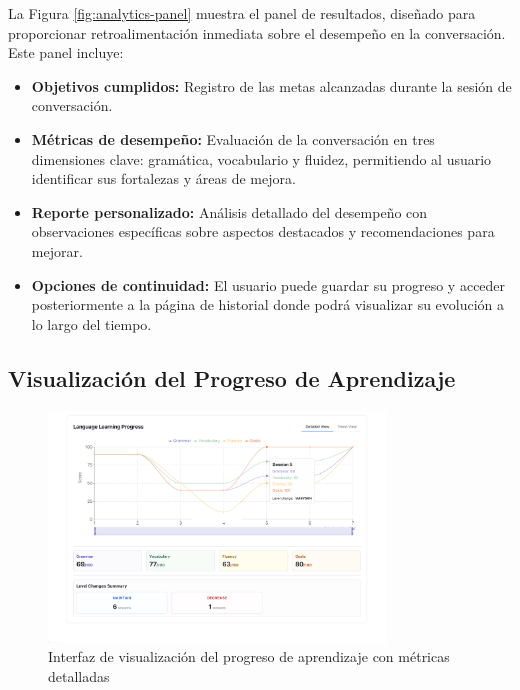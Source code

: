 La Figura \ref{fig:analytics-panel} muestra el panel de resultados, diseñado para proporcionar retroalimentación inmediata sobre el desempeño en la conversación. Este panel incluye:

\begin{itemize}
    \item \textbf{Objetivos cumplidos:} Registro de las metas alcanzadas durante la sesión de conversación.
    
    \item \textbf{Métricas de desempeño:} Evaluación de la conversación en tres dimensiones clave: gramática, vocabulario y fluidez, permitiendo al usuario identificar sus fortalezas y áreas de mejora.
    
    \item \textbf{Reporte personalizado:} Análisis detallado del desempeño con observaciones específicas sobre aspectos destacados y recomendaciones para mejorar.
    
    \item \textbf{Opciones de continuidad:} El usuario puede guardar su progreso y acceder posteriormente a la página de historial donde podrá visualizar su evolución a lo largo del tiempo.
\end{itemize}

\subsection{Visualización del Progreso de Aprendizaje}
\label{visualizacion-progreso}

\begin{figure}[H]
    \centering
    \includegraphics[width=0.8\textwidth]{figuras/screenshots/learning-history.png}
    \caption{Interfaz de visualización del progreso de aprendizaje con métricas detalladas}
    \label{fig:learning-history}
\end{figure}

